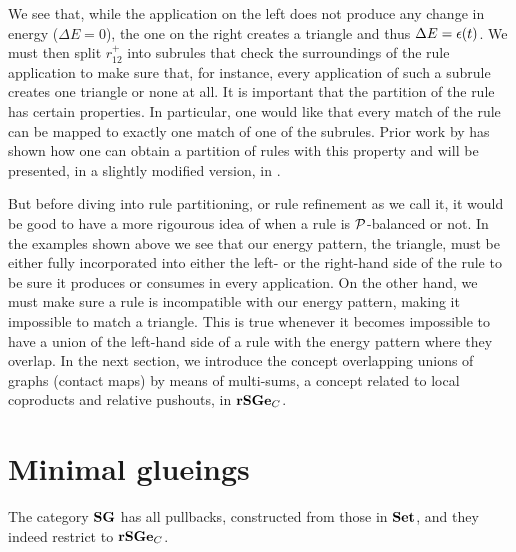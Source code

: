 We see that, while the application on the left
does not produce any change in energy ($\Delta E = 0$),
the one on the right creates a triangle
and thus $\Delta E = \epsilon(t)$. %
We must then split $r^+_{12}$ into subrules that check
the surroundings of the rule application
to make sure that, for instance,
every application of such a subrule
creates one triangle or none at all.
It is important that the partition of the rule
has certain properties.
In particular, one would like that every match of the rule
can be mapped to exactly one match of one of the subrules.
Prior work by \citet{refinement} has shown how
one can obtain a partition of rules with this property
and will be presented, in a slightly modified version,
in . %

But before diving into rule partitioning,
or rule refinement as we call it,
it would be good to have a more rigourous idea of
when a rule is $\mathcal{P}$-balanced or not.
In the examples shown above we see that
our energy pattern, the triangle,
must be either fully incorporated into
either the left- or the right-hand side of the rule
to be sure it produces or consumes in every application.
On the other hand, we must make sure a rule
is incompatible with our energy pattern,
making it impossible to match a triangle.
This is true whenever it becomes impossible to have a union
of the left-hand side of a rule with the energy pattern
where they overlap.
In the next section, we introduce the concept overlapping unions
of graphs (\ie contact maps) by means of multi-sums,
a concept related to local coproducts and relative pushouts,
in $\mathbf{rSGe}_C$.


\section{Minimal glueings}
\label{sec:mg}

The category $\mathbf{SG}$ has all pullbacks,
constructed from those in $\mathbf{Set}$,
and they indeed restrict to $\mathbf{rSGe}_C$.

